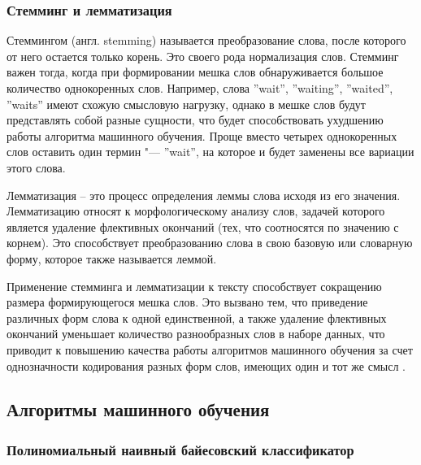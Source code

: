 \documentclass[bachelor, och, coursework]{SCWorks}
\begin{document}
        \subsubsection{Стемминг и лемматизация}
            Стеммингом (англ. stemming) называется преобразование слова, после
            которого от него остается только корень. Это своего рода
            нормализация слов. Стемминг важен тогда, когда при формировании
            мешка слов обнаруживается большое количество однокоренных слов.
            Например, слова ''wait'', ''waiting'', ''waited'', ''waits'' имеют
            схожую смысловую нагрузку, однако в мешке слов будут представлять
            собой разные сущности, что будет способствовать ухудшению работы
            алгоритма машинного обучения. Проще вместо четырех однокоренных слов
            оставить один термин "--- ''wait'', на которое и будет заменены все
            вариации этого слова.

            Лемматизация – это процесс определения леммы слова исходя из его
            значения. Лемматизацию относят к морфологическому анализу слов,
            задачей которого является удаление флективных окончаний (тех, что
            соотносятся по значению с корнем). Это способствует преобразованию
            слова в свою базовую или словарную форму, которое также называется
            леммой.

            Применение стемминга и лемматизации к тексту способствует сокращению
            размера формирующегося мешка слов. Это вызвано тем, что приведение
            различных форм слова к одной единственной, а также удаление
            флективных окончаний уменьшает количество разнообразных слов в
            наборе данных, что приводит к повышению качества работы алгоритмов
            машинного обучения за счет однозначности кодирования разных форм
            слов, имеющих один и тот же смысл \cite{coll}.
            

    \subsection{Алгоритмы машинного обучения}
        \subsubsection{Полиномиальный наивный байесовский классификатор}
            
\end{document}
